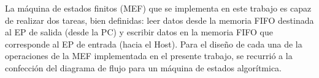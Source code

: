 %			
%
%
La máquina de estados finitos (MEF) que se implementa en este trabajo es capaz de realizar dos tareas, bien definidas: leer datos desde la memoria FIFO destinada al EP de salida (desde la PC) y escribir datos en la memoria FIFO que corresponde al EP de entrada (hacia el Host). 
Para el diseño de cada una de la operaciones de la MEF implementada en el presente trabajo, se recurrió a la confección del diagrama de flujo para un máquina de estados algorítmica.



